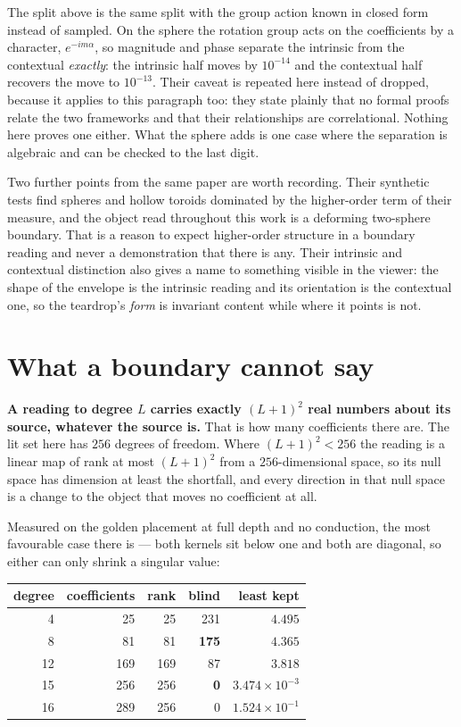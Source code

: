The split above is the same split with the group action known in closed form instead of sampled. On the sphere the rotation group acts on the coefficients by a character, \(e^{-im\alpha}\), so magnitude and phase separate the intrinsic from the contextual \emph{exactly}: the intrinsic half moves by \(10^{-14}\) and the contextual half recovers the move to \(10^{-13}\). Their caveat is repeated here instead of dropped, because it applies to this paragraph too: they state plainly that no formal proofs relate the two frameworks and that their relationships are correlational. Nothing here proves one either. What the sphere adds is one case where the separation is algebraic and can be checked to the last digit.

Two further points from the same paper are worth recording. Their synthetic tests find spheres and hollow toroids dominated by the higher-order term of their measure, and the object read throughout this work is a deforming two-sphere boundary. That is a reason to expect higher-order structure in a boundary reading and never a demonstration that there is any. Their intrinsic and contextual distinction also gives a name to something visible in the viewer: the shape of the envelope is the intrinsic reading and its orientation is the contextual one, so the teardrop's \emph{form} is invariant content while where it points is not.

\section{What a boundary cannot say}
\label{sec:rank}

\textbf{A reading to degree \(L\) carries exactly \((L+1)^2\) real numbers about its source, whatever the source is.} That is how many coefficients there are. The lit set here has \(256\) degrees of freedom. Where \((L+1)^2 < 256\) the reading is a linear map of rank at most \((L+1)^2\) from a \(256\)-dimensional space, so its null space has dimension at least the shortfall, and every direction in that null space is a change to the object that moves no coefficient at all.

Measured on the golden placement at full depth and no conduction, the most favourable case there is --- both kernels sit below one and both are diagonal, so either can only shrink a singular value:

\begin{center}
\begin{tabular}{rrrrr}
\toprule
degree & coefficients & rank & blind & least kept \\
\midrule
4 & 25 & 25 & 231 & \(4.495\) \\
8 & 81 & 81 & \textbf{175} & \(4.365\) \\
12 & 169 & 169 & 87 & \(3.818\) \\
15 & 256 & 256 & \textbf{0} & \(3.474 \times 10^{-3}\) \\
16 & 289 & 256 & 0 & \(1.524 \times 10^{-1}\) \\
\bottomrule
\end{tabular}
\end{center}

